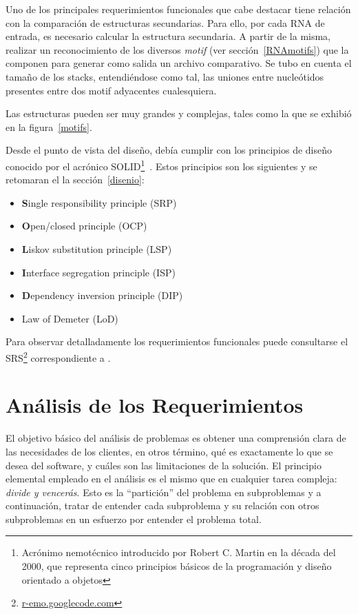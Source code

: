 \par Uno de los principales requerimientos funcionales que cabe destacar tiene relación con la comparación de estructuras secundarias. Para ello, por cada RNA de entrada, es necesario calcular la estructura secundaria. A partir de la misma, realizar un reconocimiento de los diversos \emph{motif} (ver sección~\ref{RNAmotifs}) que la componen para generar como salida un archivo comparativo. Se tubo en cuenta el tamaño de los stacks, entendiéndose como tal, las uniones entre nucleótidos presentes entre dos motif adyacentes cualesquiera.  
\par Las estructuras pueden ser muy grandes y complejas, tales como la que se exhibió en la figura~\ref{motifs}.

\par Desde el punto de vista del diseño, \remo debía cumplir con los principios de diseño conocido por el acrónico SOLID\footnote{Acrónimo nemotécnico introducido por Robert C. Martin en la década del 2000, que representa cinco principios básicos de la programación y diseño orientado a objetos}~\cite{Martin00}. Estos principios son los siguientes y se retomaran el la sección~\ref{disenio}:
\begin{itemize}
	\item \textbf{S}ingle responsibility principle (SRP)
	\item \textbf{O}pen/closed principle (OCP)
	\item \textbf{L}iskov substitution principle (LSP)
	\item \textbf{I}nterface segregation principle (ISP)
	\item \textbf{D}ependency inversion principle (DIP)	
	\item Law of Demeter (LoD)
\end{itemize}

\par Para observar detalladamente los requerimientos funcionales puede consultarse el SRS\footnote{\url{r-emo.googlecode.com}} correspondiente a \remo.

\section{Análisis de los Requerimientos}
\par El objetivo básico del análisis de problemas es obtener una comprensión clara de las necesidades de los clientes, en otros término, qué es exactamente lo que se desea del software, y cuáles son las limitaciones de la solución. El principio elemental empleado en el análisis es el mismo que en cualquier tarea compleja: \emph{divide y vencerás}. Esto es la “partición” del problema en subproblemas y a continuación, tratar de entender cada subproblema y su relación con otros subproblemas en un esfuerzo por entender el problema total.

